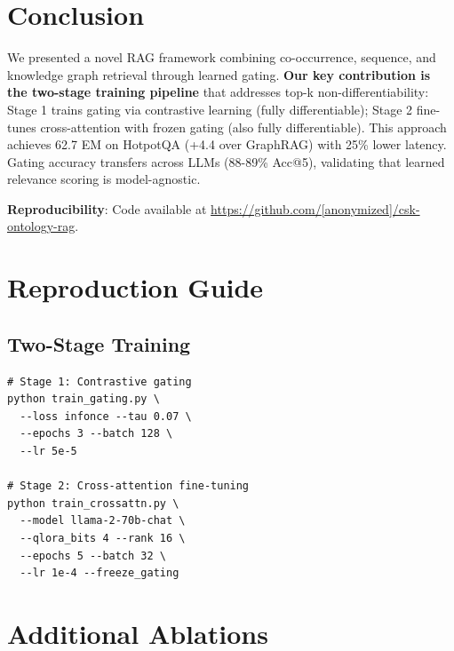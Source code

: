 \documentclass[10pt,twocolumn]{article}
\begin{document}
\section{Conclusion}

We presented a novel RAG framework combining co-occurrence, sequence, and knowledge graph retrieval through learned gating. \textbf{Our key contribution is the two-stage training pipeline} that addresses top-k non-differentiability: Stage 1 trains gating via contrastive learning (fully differentiable); Stage 2 fine-tunes cross-attention with frozen gating (also fully differentiable). This approach achieves 62.7 EM on HotpotQA (+4.4 over GraphRAG) with 25\% lower latency. Gating accuracy transfers across LLMs (88-89\% Acc@5), validating that learned relevance scoring is model-agnostic.

\textbf{Reproducibility}: Code available at \url{https://github.com/[anonymized]/csk-ontology-rag}.




\appendix

\section{Reproduction Guide}
\label{app:repro}

\subsection{Two-Stage Training}
\begin{verbatim}
# Stage 1: Contrastive gating
python train_gating.py \
  --loss infonce --tau 0.07 \
  --epochs 3 --batch 128 \
  --lr 5e-5

# Stage 2: Cross-attention fine-tuning
python train_crossattn.py \
  --model llama-2-70b-chat \
  --qlora_bits 4 --rank 16 \
  --epochs 5 --batch 32 \
  --lr 1e-4 --freeze_gating
\end{verbatim}

\section{Additional Ablations}
\label{app:ablations}
\end{document}
